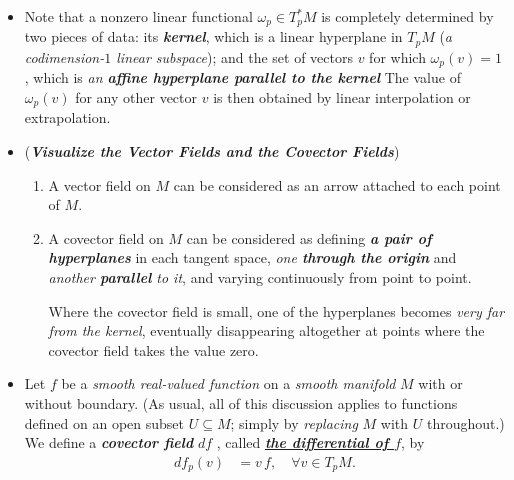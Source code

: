 \documentclass[11pt]{article}
\begin{document}
\begin{itemize}
\item \begin{remark}
Note that a nonzero linear functional $\omega_{p} \in T_{p}^{*}M$ is completely determined by two pieces of data: its \emph{\textbf{kernel}}, which is a linear hyperplane in $T_{p}M$ (\emph{a codimension-$1$ linear subspace}); and the set of vectors $v$ for which $\omega_p(v) = 1$, which is \emph{an \textbf{affine hyperplane parallel to the kernel}}  The value of $\omega_{p}(v)$ for any other vector $v$ is then obtained by linear interpolation or extrapolation.
\end{remark}

\item \begin{remark} (\textbf{\emph{Visualize the Vector Fields and the Covector Fields}})
\begin{enumerate}
\item A vector field on $M$ can be considered as an arrow attached to each point of $M$.
\item A covector field on $M$ can be considered as defining \emph{\textbf{a pair of hyperplanes}} in each tangent space, \emph{one \textbf{through the origin}} and \emph{another \textbf{parallel} to it}, and varying continuously from point to point. 

Where the covector field is small, one of the hyperplanes becomes \emph{very far from the kernel}, eventually disappearing altogether at points where the covector field takes the value zero.
\end{enumerate}
\end{remark}

\item  \begin{definition}
Let $f$ be a \emph{smooth real-valued function} on a \emph{smooth manifold} $M$ with or without boundary. (As usual, all of this discussion applies to functions defined on an open subset $U \subseteq M$; simply by \emph{replacing} $M$ with $U$ throughout.) We define a \emph{\textbf{covector field}} $df$ , called \underline{\emph{\textbf{the differential of $f$}}}, by
\begin{align*}
df_{p}(v) &= v\,f, \quad \forall v\in T_{p}M.
\end{align*}
\end{definition}



\end{itemize}
\end{document}
